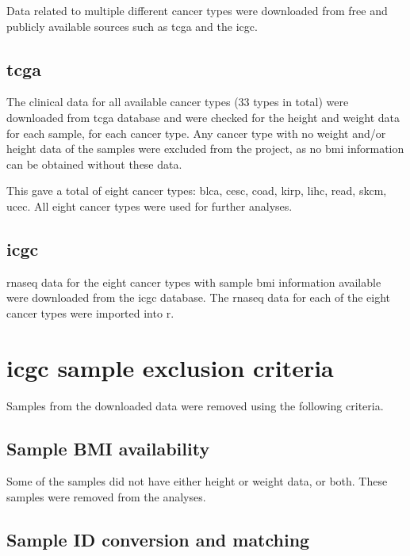 Data related to multiple different cancer types were downloaded from free and publicly available sources such as \gls{tcga} and the \gls{icgc}.

\subsection{\gls{tcga}}
\label{subsec:tcga}

The clinical data for all available cancer types (33 types in total) were downloaded from \gls{tcga} database and were checked for the height and weight data for each sample, for each cancer type.
Any cancer type with no weight and/or height data of the samples were excluded from the project, as no \gls{bmi} information can be obtained without these data.

This gave a total of eight cancer types: \gls{blca}, \gls{cesc}, \gls{coad}, \gls{kirp}, \gls{lihc}, \gls{read}, \gls{skcm}, \gls{ucec}.
All eight cancer types were used for further analyses.

\subsection{\gls{icgc}}
\label{subsec:icgc}

\gls{rnaseq} data for the eight cancer types with sample \gls{bmi} information available were downloaded from the \gls{icgc} database.
The \gls{rnaseq} data for each of the eight cancer types were imported into \gls{r}.

\section{\gls{icgc} sample exclusion criteria}
\label{sec:sampleexclusion}

Samples from the downloaded data were removed using the following criteria.

\subsection{Sample BMI availability}
\label{subsec:samplebmiavailability}

Some of the samples did not have either height or weight data, or both.
These samples were removed from the analyses.

\subsection{Sample ID conversion and matching}
\label{subsec:sampleidconversion}

